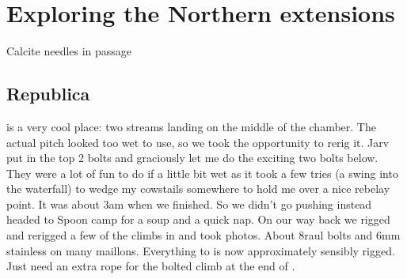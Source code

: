 \section{Exploring the Northern extensions}

\begin{marginfigure}
	\centering
         \caption{Calcite needles in \protect{} passage }
         \label{calcite needles}
 \end{marginfigure}

\subsection{Republica}  is a very cool place: two streams landing on the middle of the chamber. The actual pitch looked too wet to use, so we took the opportunity to rerig it. 
Jarv put in the top 2 bolts and graciously let me do the exciting two bolts below.  They were a lot of fun to do if a little bit wet as it took a few tries (a swing into the waterfall) to wedge my cowstails somewhere to hold me over a nice rebelay point. It was about 3am when we finished. So we didn't go pushing instead headed to Spoon camp for a soup and a quick nap.  On our way back we rigged and rerigged a few of the climbs in  and took photos. About 8raul bolts and 6mm stainless on many maillons.
Everything to  is now approximately sensibly rigged. Just need an extra rope for the bolted climb at the end of .




